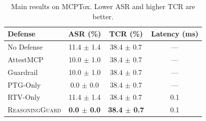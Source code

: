 \begin{table}[t]
\centering
\small
\begin{tabular}{lccc}
\toprule
Defense & ASR (\%) & TCR (\%) & Latency (ms) \\
\midrule
No Defense & 11.4 $\pm$ 1.4 & 38.4 $\pm$ 0.7 & --- \\
AttestMCP & 10.0 $\pm$ 1.0 & 38.4 $\pm$ 0.7 & --- \\
Guardrail & 10.0 $\pm$ 1.0 & 38.4 $\pm$ 0.7 & --- \\
PTG-Only & 0.0 $\pm$ 0.0 & 38.4 $\pm$ 0.7 & --- \\
RTV-Only & 11.4 $\pm$ 1.4 & 38.4 $\pm$ 0.7 & 0.1 \\
\textsc{ReasoningGuard} & \textbf{0.0 $\pm$ 0.0} & \textbf{38.4 $\pm$ 0.7} & 0.1 \\
\bottomrule
\end{tabular}
\caption{Main results on MCPTox. Lower ASR and higher TCR are better.}
\label{tab:main}
\end{table}
